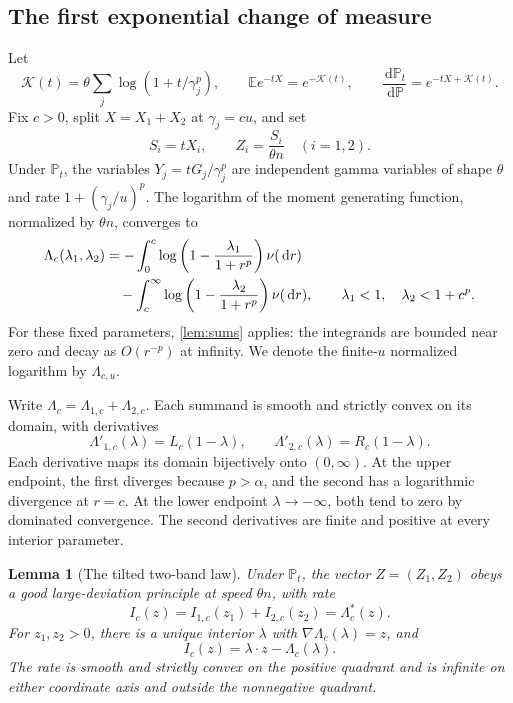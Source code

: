 \documentclass[11pt,letterpaper]{article}
\numberwithin{equation}{section}
\newtheorem{lemma}[theorem]{Lemma}
\theoremstyle{definition}
\theoremstyle{remark}
\newcommand{\PP}{\mathbb P}
\newcommand{\EE}{\mathbb E}
\newcommand{\dd}{\,\mathrm d}
\begin{document}
\subsection{The first exponential change of measure}

Let
\begin{equation}\label{eq:Laplace}
 \mathcal K(t)=\theta\sum_j\log(1+t/\gamma_j^p),
 \qquad \EE e^{-tX}=e^{-\mathcal K(t)},
 \qquad \frac{\dd\PP_t}{\dd\PP}=e^{-tX+\mathcal K(t)}.
\end{equation}
Fix $c>0$, split $X=X_1+X_2$ at $\gamma_j=cu$, and set
\begin{equation}\label{eq:Z}
 S_i=tX_i,\qquad Z_i=\frac{S_i}{\theta n}\quad(i=1,2).
\end{equation}
Under $\PP_t$, the variables $Y_j=tG_j/\gamma_j^p$ are independent gamma variables of shape $\theta$ and rate $1+(\gamma_j/u)^p$. The logarithm of the moment generating function, normalized by $\theta n$, converges to
\begin{align}\label{eq:Lambda}
 \Lambda_c(\lambda_1,\lambda_2)
 &=-\int_0^c\log\left(1-\frac{\lambda_1}{1+r^p}\right)\nu(\dd r)\notag\\
 &\quad-\int_c^\infty\log\left(1-\frac{\lambda_2}{1+r^p}\right)\nu(\dd r),
 \qquad \lambda_1<1,\quad\lambda_2<1+c^p.
\end{align}
For these fixed parameters, \cref{lem:sums} applies: the integrands are bounded near zero and decay as $O(r^{-p})$ at infinity. We denote the finite-$u$ normalized logarithm by $\Lambda_{c,u}$.

Write $\Lambda_c=\Lambda_{1,c}+\Lambda_{2,c}$. Each summand is smooth and strictly convex on its domain, with derivatives
\begin{equation}\label{eq:Lambda_derivative}
 \Lambda'_{1,c}(\lambda)=L_c(1-\lambda),\qquad
 \Lambda'_{2,c}(\lambda)=R_c(1-\lambda).
\end{equation}
Each derivative maps its domain bijectively onto $(0,\infty)$. At the upper endpoint, the first diverges because $p>\alpha$, and the second has a logarithmic divergence at $r=c$. At the lower endpoint $\lambda\to-\infty$, both tend to zero by dominated convergence. The second derivatives are finite and positive at every interior parameter.

\begin{lemma}[The tilted two-band law]\label{lem:tiltedLDP}
Under $\PP_t$, the vector $Z=(Z_1,Z_2)$ obeys a good large-deviation principle at speed $\theta n$, with rate
\begin{equation}\label{eq:I}
 I_c(z)=I_{1,c}(z_1)+I_{2,c}(z_2)=\Lambda_c^*(z).
\end{equation}
For $z_1,z_2>0$, there is a unique interior $\lambda$ with $\nabla\Lambda_c(\lambda)=z$, and
\begin{equation}\label{eq:I_eval}
 I_c(z)=\lambda\cdot z-\Lambda_c(\lambda).
\end{equation}
The rate is smooth and strictly convex on the positive quadrant and is infinite on either coordinate axis and outside the nonnegative quadrant.
\end{lemma}
\end{document}
